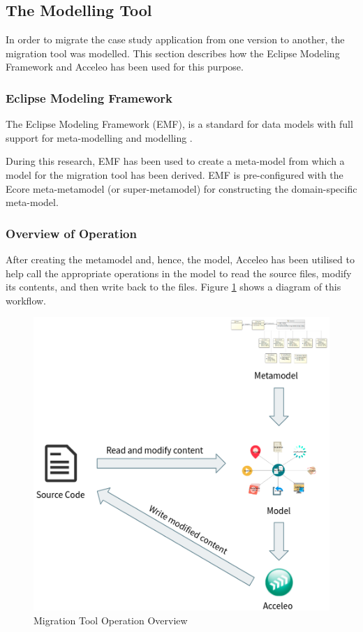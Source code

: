 \documentclass[conference]{IEEEtran}
\begin{document}
\subsection{The Modelling Tool}

In order to migrate the case study application from one version to another, the migration tool was modelled. This section describes how the Eclipse Modeling Framework and Acceleo has been used for this purpose.

\subsubsection{Eclipse Modeling Framework}

The Eclipse Modeling Framework (EMF), is a standard for data models with full support for meta-modelling and modelling \cite{b7}.

During this research, EMF has been used to create a meta-model from which a model for the migration tool has been derived. EMF is pre-configured with the Ecore meta-metamodel (or super-metamodel) for constructing the domain-specific meta-model.

\subsubsection{Overview of Operation}

After creating the metamodel and, hence, the model, Acceleo has been utilised to help call the appropriate operations in the model to read the source files, modify its contents, and then write back to the files. Figure \ref{fig:operation} shows a diagram of this workflow.

\begin{figure}[htbp]
\centerline{\includegraphics[width=\linewidth,keepaspectratio]{workflow.png}}
\caption{Migration Tool Operation Overview}
\label{fig:operation}
\end{figure}
\end{document}
